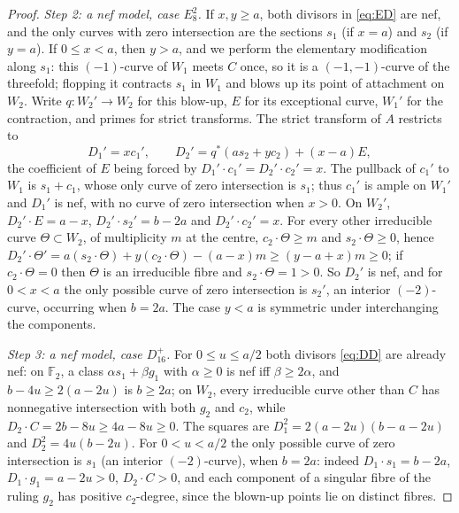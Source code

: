 \documentclass[11pt]{article}
\newcommand{\F}{\mathbb F}
\theoremstyle{definition}
\theoremstyle{remark}
\begin{document}
\begin{proof}
\emph{Step 2: a nef model, case \(E_8^2\).}
If \(x,y\geq a\), both divisors in \eqref{eq:ED} are nef, and the
only curves with zero intersection are the sections \(s_1\) (if
\(x=a\)) and \(s_2\) (if \(y=a\)). If \(0\leq x<a\), then \(y>a\), and
we perform the elementary modification along \(s_1\): this
\((-1)\)-curve of \(W_1\) meets \(C\) once, so it is a
\((-1,-1)\)-curve of the threefold; flopping it contracts \(s_1\) in
\(W_1\) and blows up its point of attachment on \(W_2\). Write
\(q\colon W_2'\to W_2\) for this blow-up, \(E\) for its exceptional
curve, \(W_1'\) for the contraction, and primes for strict transforms.
The strict transform of \(A\) restricts to
\begin{equation}\label{eq:flop}
 D_1'=xc_1',\qquad D_2'=q^*(as_2+yc_2)+(x-a)E ,
\end{equation}
the coefficient of \(E\) being forced by
\(D_1'\cdot c_1'=D_2'\cdot c_2'=x\). The pullback of \(c_1'\) to \(W_1\) is \(s_1+c_1\), whose only curve
of zero intersection is \(s_1\); thus \(c_1'\) is ample on \(W_1'\)
and \(D_1'\) is nef, with no curve of zero intersection when \(x>0\).
On \(W_2'\), \(D_2'\cdot E=a-x\), \(D_2'\cdot s_2'=b-2a\) and
\(D_2'\cdot c_2'=x\). For every other irreducible curve \(\Theta\subset W_2\), of
multiplicity \(m\) at the centre, \(c_2\cdot\Theta\geq m\) and
\(s_2\cdot\Theta\geq0\), hence
\(D_2'\cdot\Theta'=a(s_2\cdot\Theta)+y(c_2\cdot\Theta)-(a-x)m\geq
(y-a+x)m\geq0\); if \(c_2\cdot\Theta=0\) then \(\Theta\) is an
irreducible fibre and \(s_2\cdot\Theta=1>0\). So \(D_2'\) is nef, and
for \(0<x<a\) the only possible curve of zero intersection is
\(s_2'\), an interior \((-2)\)-curve, occurring when \(b=2a\). The case
\(y<a\) is symmetric under interchanging the components.

\emph{Step 3: a nef model, case \(D_{16}^+\).}
For \(0\leq u\leq a/2\) both divisors \eqref{eq:DD} are already nef:
on \(\F_2\), a class \(\alpha s_1+\beta g_1\) with \(\alpha\geq0\) is
nef iff \(\beta\geq2\alpha\), and \(b-4u\geq2(a-2u)\) is
\(b\geq2a\); on \(W_2\), every irreducible curve other than \(C\) has
nonnegative intersection with both \(g_2\) and \(c_2\), while
\(D_2\cdot C=2b-8u\geq4a-8u\geq0\). The squares are
\(D_1^2=2(a-2u)(b-a-2u)\) and \(D_2^2=4u(b-2u)\).
For \(0<u<a/2\) the only possible curve of zero intersection is
\(s_1\) (an interior \((-2)\)-curve), when \(b=2a\): indeed
\(D_1\cdot s_1=b-2a\), \(D_1\cdot g_1=a-2u>0\), \(D_2\cdot C>0\), and
each component of a singular fibre of the ruling \(g_2\) has positive
\(c_2\)-degree, since the blown-up points lie on distinct fibres.


\end{proof}
\end{document}
